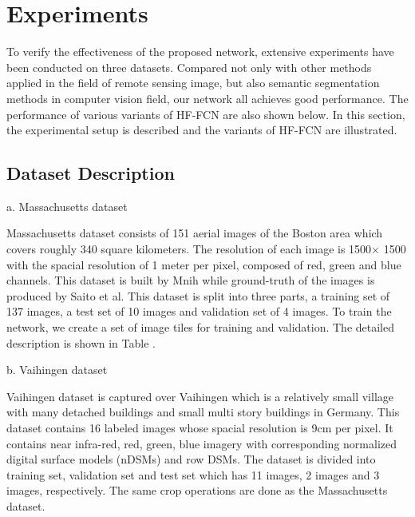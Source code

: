\section{Experiments}
\label{Sec:Exp}
To verify the effectiveness of the proposed network, extensive experiments have been conducted on three datasets. Compared not only with other methods applied in the field of remote sensing image, but also semantic segmentation methods in computer vision field, our network all achieves good performance. The performance of various variants of HF-FCN are also shown below. In this section, the experimental setup is described and the variants of HF-FCN are illustrated.
\subsection{Dataset Description}
a. Massachusetts dataset\par
\setlength{\parindent}{4ex}Massachusetts dataset consists of 151 aerial images of the Boston area which covers roughly 340 square kilometers. The resolution of each image is 1500$\times$ 1500 with the spacial resolution of 1 meter per pixel, composed of red, green and blue channels. This dataset is built by Mnih while ground-truth of the images is produced by Saito et al. This dataset is split into three parts,  a training set of 137 images, a test set of 10 images and validation set of 4 images. To train the network, we create a set of image tiles for training and validation. The detailed description is shown in Table .\par

\setlength{\parindent}{2ex}b. Vaihingen dataset\par
\setlength{\parindent}{4ex}Vaihingen dataset is captured over Vaihingen which is a relatively small village with many detached buildings and small multi story buildings in Germany. This dataset contains 16 labeled images whose spacial resolution is 9cm per pixel. It contains near infra-red, red, green, blue imagery with corresponding normalized digital surface models (nDSMs) and row DSMs. The dataset is divided into training set, validation set and test set which has 11 images, 2 images and 3 images, respectively. The same crop operations are done as the Massachusetts dataset.\par

